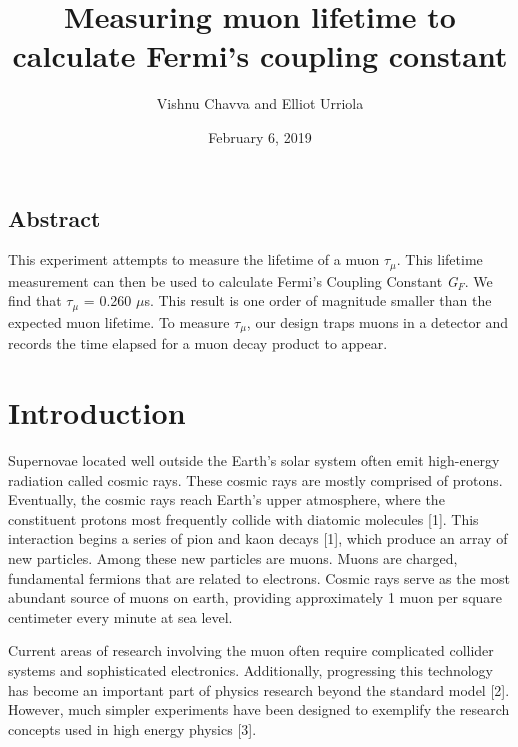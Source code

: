 \documentclass{article}
\title{Measuring muon lifetime to calculate Fermi's coupling constant}
\author{Vishnu Chavva and Elliot Urriola }
\date{February 6, 2019}
\begin{document}
\maketitle

\begin{center}
    \section*{Abstract}
\end{center}

\begin{hfill}

    This experiment attempts to measure the lifetime of a muon $\tau_{\mu}$. This lifetime measurement can then be used to calculate Fermi's Coupling Constant \textit{G$_{F}$}. We find that $\tau_{\mu}$ = 0.260 $\mu$s. This result is one order of magnitude smaller than the expected muon lifetime. To measure $\tau_{\mu}$, our design traps muons in a detector and records the time elapsed for a muon decay product to appear.


\end{hfill}

\vspace{5mm}


\section*{Introduction}

\hspace{3.5mm} Supernovae located well outside the Earth's solar system often emit high-energy radiation called cosmic rays. These cosmic rays are mostly comprised of protons. %
Eventually, the cosmic rays reach Earth's  upper atmosphere, where the constituent protons most frequently collide with diatomic molecules [1]. %
This interaction begins a series of pion and kaon decays [1], which produce an array of new particles. Among these new particles are muons. Muons are charged, fundamental fermions that are related to electrons. Cosmic rays serve as the most abundant source of muons on earth, providing approximately 1 muon per square centimeter every minute at sea level.

Current areas of research involving the muon often require complicated collider systems and sophisticated electronics. Additionally, progressing this technology has become an important part of physics research beyond the standard model [2]. %
However, much simpler experiments have been designed to exemplify the research concepts used in high energy physics [3]. %
\end{document}
